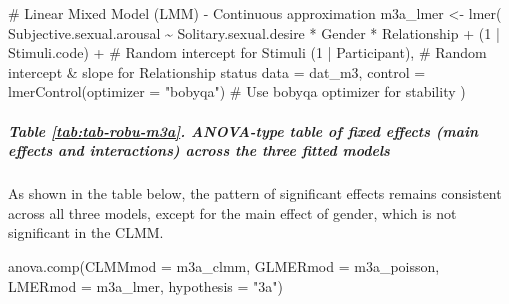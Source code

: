 \documentclass[
  bookmarksnumbered]{article}
\newenvironment{Shaded}{\begin{snugshade}}{\end{snugshade}}
\newcommand{\AttributeTok}[1]{\textcolor[rgb]{0.80,0.80,0.80}{#1}}
\newcommand{\CommentTok}[1]{\textcolor[rgb]{0.50,0.62,0.50}{#1}}
\newcommand{\DecValTok}[1]{\textcolor[rgb]{0.86,0.86,0.80}{#1}}
\newcommand{\FunctionTok}[1]{\textcolor[rgb]{0.94,0.94,0.56}{#1}}
\newcommand{\NormalTok}[1]{\textcolor[rgb]{0.80,0.80,0.80}{#1}}
\newcommand{\OtherTok}[1]{\textcolor[rgb]{0.94,0.94,0.56}{#1}}
\newcommand{\SpecialCharTok}[1]{\textcolor[rgb]{0.86,0.64,0.64}{#1}}
\newcommand{\StringTok}[1]{\textcolor[rgb]{0.80,0.58,0.58}{#1}}
\begin{document}
\begin{Shaded}
\begin{Highlighting}[]
\CommentTok{\# Linear Mixed Model (LMM) {-} Continuous approximation}
\NormalTok{m3a\_lmer }\OtherTok{\textless{}{-}} \FunctionTok{lmer}\NormalTok{(}
\NormalTok{  Subjective.sexual.arousal }\SpecialCharTok{\textasciitilde{}}\NormalTok{ Solitary.sexual.desire }\SpecialCharTok{*}\NormalTok{ Gender }\SpecialCharTok{*}\NormalTok{ Relationship }\SpecialCharTok{+}
\NormalTok{    (}\DecValTok{1} \SpecialCharTok{|}\NormalTok{ Stimuli.code) }\SpecialCharTok{+} \CommentTok{\# Random intercept for Stimuli}
\NormalTok{    (}\DecValTok{1} \SpecialCharTok{|}\NormalTok{ Participant), }\CommentTok{\# Random intercept \& slope for Relationship status}
  \AttributeTok{data =}\NormalTok{ dat\_m3,}
  \AttributeTok{control =} \FunctionTok{lmerControl}\NormalTok{(}\AttributeTok{optimizer =} \StringTok{"bobyqa"}\NormalTok{) }\CommentTok{\# Use \textquotesingle{}bobyqa\textquotesingle{} optimizer for stability}
\NormalTok{)}
\end{Highlighting}
\end{Shaded}

\subparagraph{Table \ref{tab:tab-robu-m3a}. ANOVA-type table of fixed effects (main effects and interactions) across the three fitted models}\label{table-reftabtab-robu-m3a.-anova-type-table-of-fixed-effects-main-effects-and-interactions-across-the-three-fitted-models}

As shown in the table below, the pattern of significant effects remains consistent across all three models, except for the main effect of gender, which is not significant in the CLMM.

\begin{Shaded}
\begin{Highlighting}[]
\FunctionTok{anova.comp}\NormalTok{(}\AttributeTok{CLMMmod =}\NormalTok{ m3a\_clmm, }\AttributeTok{GLMERmod =}\NormalTok{ m3a\_poisson, }\AttributeTok{LMERmod =}\NormalTok{ m3a\_lmer, }\AttributeTok{hypothesis =} \StringTok{"3a"}\NormalTok{)}
\end{Highlighting}
\end{Shaded}
\end{document}
